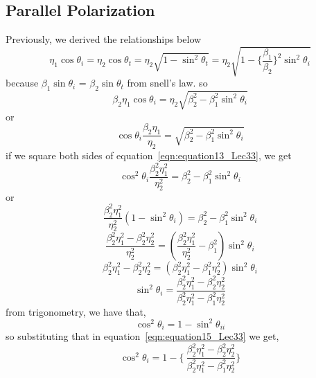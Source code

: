 \subsection{Parallel Polarization}
Previously, we derived the relationships below
\begin{dmath}
\eta_1\cos\theta_i = \eta_2\cos\theta_t  = \eta_2\sqrt{1 - \sin^2\theta_t} = \eta_2\sqrt{1- \Bigg\{\dfrac{\beta_1}{\beta_2}\Bigg\}^2\sin^2\theta_i}
\end{dmath}
because $\beta_1\sin\theta_i$ = $\beta_2\sin\theta_t$ from snell's law. so
\begin{equation*}
\beta_2\eta_1\cos\theta_i = \eta_2\sqrt{\beta_2^2-\beta_1^2\sin^2\theta_i}
\end{equation*}
or
\begin{equation}
\cos\theta_i\dfrac{\beta_2\eta_1}{\eta_2} = \sqrt{\beta_2^2-\beta_1^2\sin^2\theta_i}
\label{eqn:equation13_Lec33}
\end{equation}
if we square both sides of equation~\ref{eqn:equation13_Lec33}, we get
\begin{equation*}
\cos^2\theta_i \dfrac{\beta^2_2\eta^2_1}{\eta^2_2} = \beta^2_2 - \beta^2_1\sin^2\theta_i
\end{equation*}
or
\begin{equation}
\dfrac{\beta^2_2\eta^2_1}{\eta^2_2}(1 - \sin^2\theta_i) = \beta^2_2 - \beta^2_1\sin^2\theta_i
\end{equation}
\begin{equation*}
\dfrac{\beta^2_2\eta^2_1 - \beta^2_2\eta^2_2}{\eta^2_2} = (\dfrac{\beta^2_2\eta^2_1}{\eta^2_2} - \beta^2_1)\sin^2\theta_i
\end{equation*}
\begin{equation*}
\beta^2_2\eta^2_1 - \beta^2_2\eta^2_2 = (\beta^2_2\eta^2_1 - \beta^2_1\eta^2_2)\sin^2{\theta_i}
\end{equation*}
\begin{equation}
\sin^2{\theta_i} = \dfrac{\beta^2_2\eta^2_1 - \beta^2_2\eta^2_2}{\beta^2_2\eta^2_1 - \beta^2_1\eta^2_2}
\label{eqn:equation15_Lec33}
\end{equation}
from trigonometry, we have that,
\begin{equation*}
\cos^2{\theta_i} = 1 - \sin^2{\theta_{ii}}
\end{equation*}
so substituting that in equation~\ref{eqn:equation15_Lec33} we get,
\begin{equation}
\cos^2{\theta_i} = 1 - \Bigg\{\ \dfrac{\beta^2_2\eta^2_1 - \beta^2_2\eta^2_2}{\beta^2_2\eta^2_1 - \beta^2_1\eta^2_2} \Bigg\}
\end{equation}
